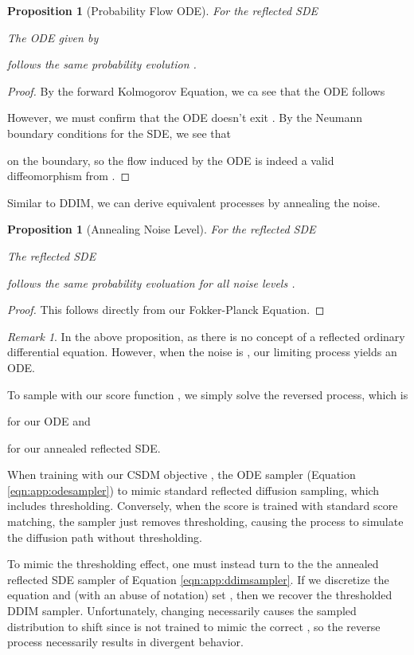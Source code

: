 \documentclass{article}
\theoremstyle{plain}
\newtheorem{proposition}[theorem]{Proposition}
\theoremstyle{definition}
\theoremstyle{remark}
\newtheorem{remark}[theorem]{Remark}
\begin{document}
\begin{proposition}[Probability Flow ODE]
    For the reflected SDE
    
    The ODE given by
    
    follows the same probability evolution .
\end{proposition}
\begin{proof}
    By the forward Kolmogorov Equation, we ca see that the ODE follows
    
    However, we must confirm that the ODE doesn't exit . By the Neumann boundary conditions for the SDE, we see that 
    
    on the boundary, so the flow induced by the ODE is indeed a valid diffeomorphism from .
\end{proof}
Similar to DDIM, we can derive equivalent processes by annealing the noise.
\begin{proposition}[Annealing Noise Level]
    For the reflected SDE
    
    The reflected SDE
    
    follows the same probability evoluation  for all noise levels .
\end{proposition}
\begin{proof}
    This follows directly from our Fokker-Planck Equation.
\end{proof}
\begin{remark}
    In the above proposition,  as there is no concept of a reflected ordinary differential equation. However, when the noise is , our limiting process yields an ODE.
\end{remark}
To sample with our score function , we simply solve the reversed process, which is

for our ODE and

for our annealed reflected SDE.

When training with our CSDM objective , the ODE sampler (Equation \ref{eqn:app:odesampler}) to mimic standard reflected diffusion sampling, which includes thresholding. Conversely, when the score is trained with standard score matching, the sampler just removes thresholding, causing the process to simulate the diffusion path without thresholding.

To mimic the thresholding effect, one must instead turn to the the annealed reflected SDE sampler of Equation \ref{eqn:app:ddimsampler}. If we discretize the equation and (with an abuse of notation) set , then we recover the thresholded DDIM sampler. Unfortunately, changing  necessarily causes the sampled distribution to shift since  is not trained to mimic the correct , so the reverse process necessarily results in divergent behavior.
\end{document}
